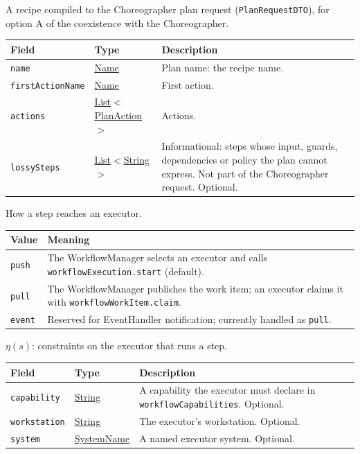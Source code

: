 \documentclass[a4paper]{arrowhead}
\newcommand{\mref}[1]{{\textcolor{ArrowheadPurple}{\hyperref[sec:model:#1]{#1}}}}
\newcommand{\pref}[1]{{\textcolor{ArrowheadGrey}{\hyperref[sec:model:primitives:#1]{#1}}}}
\begin{document}
A recipe compiled to the Choreographer plan request (\texttt{PlanRequestDTO}), for option A of the coexistence with the Choreographer.

{\small
\begin{longtable}{|p{3.9cm}|p{4.4cm}|p{7.5cm}|}

\hline
\rowcolor{gray!33} Field & Type & Description \\ \hline
\endhead
\texttt{name} & \pref{Name} & Plan name: the recipe name. \\ \hline
\texttt{firstActionName} & \pref{Name} & First action. \\ \hline
\texttt{actions} & \pref{List}$<$\mref{PlanAction}$>$ & Actions. \\ \hline
\texttt{lossySteps} & \pref{List}$<$\pref{String}$>$ & Informational: steps whose input, guards, dependencies or policy the plan cannot express. Not part of the Choreographer request. Optional. \\ \hline
\end{longtable}
}

How a step reaches an executor.

{\small
\begin{longtable}{|p{3.9cm}|p{11.9cm}|}

\hline
\rowcolor{gray!33} Value & Meaning \\ \hline
\endhead
\texttt{push} & The WorkflowManager selects an executor and calls \texttt{workflowExecution.start} (default). \\ \hline
\texttt{pull} & The WorkflowManager publishes the work item; an executor claims it with \texttt{workflowWorkItem.claim}. \\ \hline
\texttt{event} & Reserved for EventHandler notification; currently handled as \texttt{pull}. \\ \hline
\end{longtable}
}

$\eta(s)$: constraints on the executor that runs a step.

{\small
\begin{longtable}{|p{3.9cm}|p{4.4cm}|p{7.5cm}|}

\hline
\rowcolor{gray!33} Field & Type & Description \\ \hline
\endhead
\texttt{capability} & \pref{String} & A capability the executor must declare in \texttt{workflowCapabilities}. Optional. \\ \hline
\texttt{workstation} & \pref{String} & The executor's workstation. Optional. \\ \hline
\texttt{system} & \pref{SystemName} & A named executor system. Optional. \\ \hline
\end{longtable}
}
\end{document}
